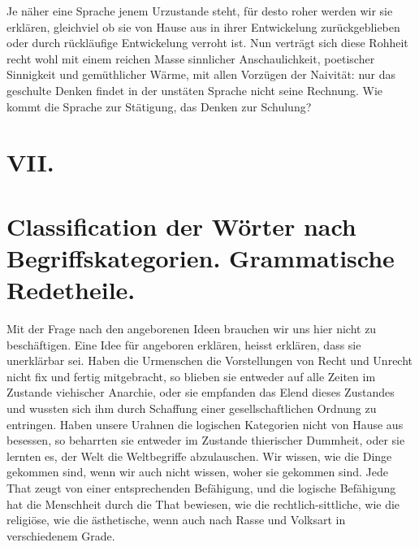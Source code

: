 Je näher eine Sprache jenem Urzustande steht, für desto roher werden wir sie erklären, gleichviel ob sie von Hause aus in ihrer Entwickelung zurückgeblieben oder durch rückläufige Entwickelung verroht ist. Nun verträgt sich diese Rohheit recht wohl mit einem reichen Masse sinnlicher Anschaulichkeit, poetischer Sinnigkeit und gemüthlicher Wärme, mit allen Vorzügen der Naivität: nur das geschulte Denken findet in der unstäten Sprache nicht seine Rechnung. Wie kommt die Sprache zur Stätigung, das Denken zur Schulung?

\clearpage{}
\section*{VII.}\label{IV.III.VII}
\section*{Classification der Wörter nach Begriffskategorien. Grammatische Redetheile.}

Mit der Frage nach den angeborenen Ideen brauchen wir uns hier nicht zu beschäftigen. Eine Idee für angeboren erklären, heisst erklären, dass sie unerklärbar sei. Haben die Urmenschen die Vorstellungen von Recht und Unrecht nicht fix und fertig mitgebracht, so blieben sie entweder auf alle Zeiten im Zustande viehischer Anarchie, oder sie empfanden das Elend dieses Zustandes und wussten sich ihm durch Schaffung einer gesellschaftlichen Ordnung zu entringen. Haben unsere Urahnen die \label{fp.366} logischen Kategorien nicht von Hause aus besessen, so beharrten sie entweder im Zustande thierischer Dummheit, oder sie lernten es, der Welt die Weltbegriffe abzulauschen. Wir wissen, wie die Dinge gekommen sind, wenn wir auch nicht wissen, woher sie gekommen sind. Jede That zeugt von einer entsprechenden Befähigung, und die logische Befähigung hat die Menschheit durch die That bewiesen, wie die rechtlich-sittliche, wie die religiöse, wie die ästhetische, wenn auch nach Rasse und Volksart in verschiedenem Grade.

